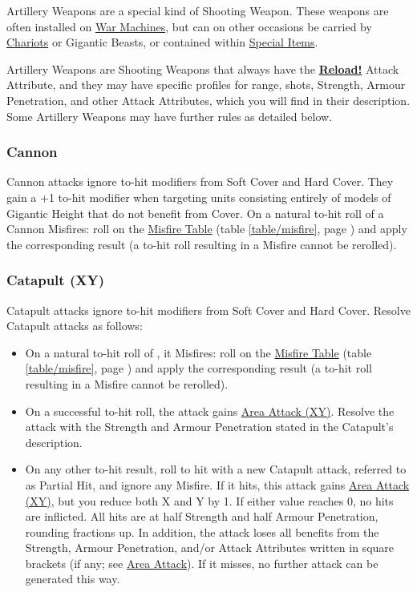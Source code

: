 Artillery Weapons are a special kind of Shooting Weapon. These weapons are often installed on \hyperref[war_machine]{War Machines}, but can on other occasions be carried by \hyperref[chariot]{Chariots} or Gigantic Beasts, or contained within \hyperref[special_items]{Special Items}.

Artillery Weapons are Shooting Weapons that always have the \hyperref[reload]{\textbf{Reload!}} Attack Attribute, and they may have specific profiles for range, shots, Strength, Armour Penetration, and other Attack Attributes, which you will find in their description. Some Artillery Weapons may have further rules as detailed below.

\subsubsection{Cannon}
\idx[main=y]{\cannon}\label{cannon}

Cannon attacks ignore to-hit modifiers from Soft Cover and Hard Cover. They gain a +1 to-hit modifier when targeting units consisting entirely of models of Gigantic Height that do not benefit from Cover. On a natural to-hit roll of  a Cannon Misfires: roll on the \hyperref[the_misfire_table]{Misfire Table} (table \ref{table/misfire}, page \pageref{table/misfire}) and apply the corresponding result (a to-hit roll resulting in a Misfire cannot be rerolled).

\subsubsection{Catapult (X\timess{}Y)}
\idx[main=y]{\catapult{}}\label{catapult}

Catapult attacks ignore to-hit modifiers from Soft Cover and Hard Cover. Resolve Catapult attacks as follows:

\begin{itemize}
\item On a natural to-hit roll of , it Misfires: roll on the \hyperref[the_misfire_table]{Misfire Table} (table \ref{table/misfire}, page \pageref{table/misfire}) and apply the corresponding result (a to-hit roll resulting in a Misfire cannot be rerolled).
\item On a successful to-hit roll, the attack gains \hyperref[area_attack]{Area Attack (X\timess{}Y)}. Resolve the attack with the Strength and Armour Penetration stated in the Catapult's description.
\item On any other to-hit result, roll to hit with a new Catapult attack, referred to as Partial Hit, and ignore any Misfire. If it hits, this attack gains \hyperref[area_attack]{Area Attack (X\timess{}Y)}, but you reduce both X and Y by 1. If either value reaches 0, no hits are inflicted. All hits are at half Strength and half Armour Penetration, rounding fractions up. In addition, the attack loses all benefits from the Strength, Armour Penetration, and/or Attack Attributes written in square brackets (if any; see \hyperref[area_attack]{Area Attack}). If it misses, no further attack can be generated this way.
\end{itemize}

